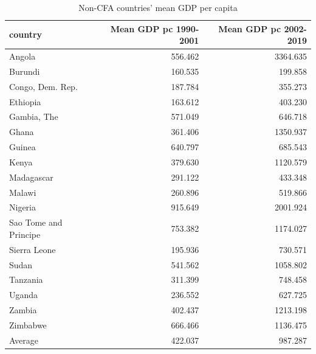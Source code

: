 \begin{table}

\caption{Non-CFA countries' mean GDP per capita }
\centering
\begin{tabular}[t]{lrr}
\toprule
country & Mean GDP pc 1990-2001 & Mean GDP pc 2002-2019\\
\midrule
Angola & 556.462 & 3364.635\\
Burundi & 160.535 & 199.858\\
Congo, Dem. Rep. & 187.784 & 355.273\\
Ethiopia & 163.612 & 403.230\\
Gambia, The & 571.049 & 646.718\\
\addlinespace
Ghana & 361.406 & 1350.937\\
Guinea & 640.797 & 685.543\\
Kenya & 379.630 & 1120.579\\
Madagascar & 291.122 & 433.348\\
Malawi & 260.896 & 519.866\\
\addlinespace
Nigeria & 915.649 & 2001.924\\
Sao Tome and Principe & 753.382 & 1174.027\\
Sierra Leone & 195.936 & 730.571\\
Sudan & 541.562 & 1058.802\\
Tanzania & 311.399 & 748.458\\
\addlinespace
Uganda & 236.552 & 627.725\\
Zambia & 402.437 & 1213.198\\
Zimbabwe & 666.466 & 1136.475\\
Average & 422.037 & 987.287\\
\bottomrule
\end{tabular}
\end{table}